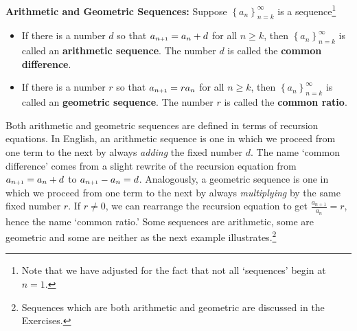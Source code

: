 \smallskip

\colorbox{ResultColor}{\bbm
\begin{defn}  \label{arithgeodefn}  \textbf{Arithmetic and Geometric Sequences:}  Suppose $\left\{ a_{n} \right\}_{n=k}^{\infty}$ is a sequence\footnote{Note that we have adjusted for the fact that not all `sequences' begin at $n=1$.}

\begin{itemize}

\item If  there is a number $d$ so that $a_{n \mbox{\tiny$ + 1$}}  = a_{n} + d$ for all $n \geq k$, then $\left\{ a_{n} \right\}_{n=k}^{\infty}$ is called an   \textbf{arithmetic sequence}.  The number $d$ is called the  \textbf{common difference}.

\item If  there is a number $r$ so that $a_{n \mbox{\tiny$ + 1$}} = r a_{n}$ for all $n \geq k$, then $\left\{ a_{n} \right\}_{n=k}^{\infty}$ is called an   \textbf{geometric sequence}.  The number $r$ is called the  \textbf{common ratio}.

\end{itemize}


\end{defn}
\ebm}

\smallskip  

Both arithmetic and geometric sequences are defined in terms of recursion equations.  In English, an arithmetic sequence is one in which we proceed from one term to the next by always \textit{adding} the fixed number $d$.  The name `common difference' comes from a slight rewrite of the recursion equation from $a_{n \mbox{\tiny$ + 1$}}  = a_{n} + d$ to $a_{n \mbox{\tiny$ + 1$}} - a_{n} = d$.  Analogously, a geometric sequence is one in which we proceed from one term to the next by always \textit{multiplying} by the same fixed number $r$. If $r \neq 0$, we can rearrange the recursion equation to get $\frac{a_{n+1}}{a_{n}} = r$, hence the name `common ratio.'  Some sequences are arithmetic, some are geometric and some are neither as the next example illustrates.\footnote{Sequences which are both arithmetic and geometric are discussed in the Exercises.}

